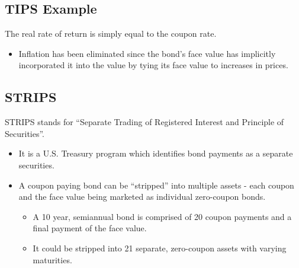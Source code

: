 \documentclass[letterpaper,10pt,english]{sphinxmanual}
\begin{document}
\subsection{TIPS Example}
\label{bondPrices:id5}
The real rate of return is simply equal to the coupon rate.
\begin{itemize}
\item {} 
Inflation has been eliminated since the bond's face value has
implicitly incorporated it into the value by tying its face value to
increases in prices.

\end{itemize}


\subsection{STRIPS}
\label{bondPrices:strips}
STRIPS stands for ``Separate Trading of Registered Interest and
Principle of Securities''.
\begin{itemize}
\item {} 
It is a U.S. Treasury program which identifies bond payments as a
separate securities.

\end{itemize}
\begin{itemize}
\item {} 
A coupon paying bond can be ``stripped'' into multiple assets - each
coupon and the face value being marketed as individual zero-coupon
bonds.
\begin{itemize}
\item {} 
A 10 year, semiannual bond is comprised of 20 coupon payments and
a final payment of the face value.

\end{itemize}
\begin{itemize}
\item {} 
It could be stripped into 21 separate, zero-coupon assets with
varying maturities.

\end{itemize}

\end{itemize}
\end{document}
